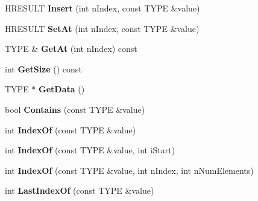 \begin{DoxyCompactItemize}
\item 
\hypertarget{class_c_growable_array_a163c27cde9aff49764ef63c4a784ffce}{H\+R\+E\+S\+U\+L\+T {\bfseries Insert} (int n\+Index, const T\+Y\+P\+E \&value)}\label{class_c_growable_array_a163c27cde9aff49764ef63c4a784ffce}

\item 
\hypertarget{class_c_growable_array_ac8768c8a2f9183af4f3f24d98f4818e1}{H\+R\+E\+S\+U\+L\+T {\bfseries Set\+At} (int n\+Index, const T\+Y\+P\+E \&value)}\label{class_c_growable_array_ac8768c8a2f9183af4f3f24d98f4818e1}

\item 
\hypertarget{class_c_growable_array_a38a2ac738d394af929a1782007a49ac0}{T\+Y\+P\+E \& {\bfseries Get\+At} (int n\+Index) const }\label{class_c_growable_array_a38a2ac738d394af929a1782007a49ac0}

\item 
\hypertarget{class_c_growable_array_ab8be085b33e3698b96dacfa8bcb5f7ee}{int {\bfseries Get\+Size} () const }\label{class_c_growable_array_ab8be085b33e3698b96dacfa8bcb5f7ee}

\item 
\hypertarget{class_c_growable_array_ab3d75c2f7eca8b3c49f63932bd8ae5bb}{T\+Y\+P\+E $\ast$ {\bfseries Get\+Data} ()}\label{class_c_growable_array_ab3d75c2f7eca8b3c49f63932bd8ae5bb}

\item 
\hypertarget{class_c_growable_array_a0b48a56bedc0c6e00e7eede32d29e752}{bool {\bfseries Contains} (const T\+Y\+P\+E \&value)}\label{class_c_growable_array_a0b48a56bedc0c6e00e7eede32d29e752}

\item 
\hypertarget{class_c_growable_array_a25e5e002fc8960491e350861d690c76b}{int {\bfseries Index\+Of} (const T\+Y\+P\+E \&value)}\label{class_c_growable_array_a25e5e002fc8960491e350861d690c76b}

\item 
\hypertarget{class_c_growable_array_a0a9c399665f3901d6c949f4f4f334208}{int {\bfseries Index\+Of} (const T\+Y\+P\+E \&value, int i\+Start)}\label{class_c_growable_array_a0a9c399665f3901d6c949f4f4f334208}

\item 
\hypertarget{class_c_growable_array_a85097aa77eaee15de0d8184bff5899f9}{int {\bfseries Index\+Of} (const T\+Y\+P\+E \&value, int n\+Index, int n\+Num\+Elements)}\label{class_c_growable_array_a85097aa77eaee15de0d8184bff5899f9}

\item 
\hypertarget{class_c_growable_array_aaff681306d8ac4a490d7bca720f2a51a}{int {\bfseries Last\+Index\+Of} (const T\+Y\+P\+E \&value)}\label{class_c_growable_array_aaff681306d8ac4a490d7bca720f2a51a}


\end{DoxyCompactItemize}

